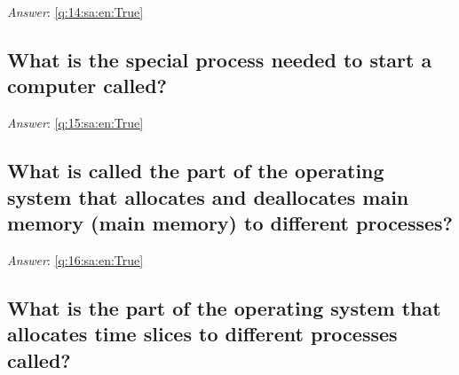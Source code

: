 \documentclass[a4paper,11pt,oneside]{article}
\begin{document}
\begin{sloppypar}
\label{q:14:sa:en:False}

\vspace{2cm}

\noindent\makebox[\textwidth]{\hrulefill}

\vspace{1cm}

\textit{Answer}: \autoref{q:14:sa:en:True}



\subsection{What is the special process needed to start a computer called?}

\label{q:15:sa:en:False}

\vspace{2cm}

\noindent\makebox[\textwidth]{\hrulefill}

\vspace{1cm}

\textit{Answer}: \autoref{q:15:sa:en:True}



\subsection{What is called the part of the operating system that allocates and deallocates main memory (main memory) to different processes?}

\label{q:16:sa:en:False}

\vspace{2cm}

\noindent\makebox[\textwidth]{\hrulefill}

\vspace{1cm}

\textit{Answer}: \autoref{q:16:sa:en:True}



\subsection{What is the part of the operating system that allocates time slices to different processes called?}

\label{q:17:sa:en:False}

\vspace{2cm}

\noindent\makebox[\textwidth]{\hrulefill}

\vspace{1cm}


\end{sloppypar}
\end{document}
